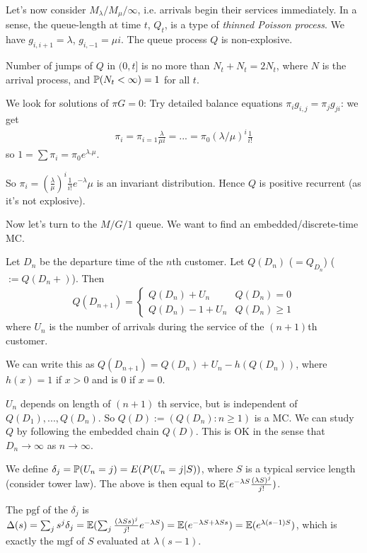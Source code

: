 \documentclass[a4paper]{article}
\begin{document}
Let's now consider $M_\lambda/M_\mu/\infty$, i.e. arrivals begin their services immediately. In a sense, the queue-length at time $t$, $Q_t$, is a type of \emph{thinned Poisson process}. We have $g_{i,i+1} = \lambda$, $g_{i,-1} = \mu i $. The queue process $Q$ is non-explosive.

Number of jumps of $Q$ in $(0,t]$ is no more than $N_t + N_t = 2N_t$, where $N$ is the arrival process, and $\P(N_t < \infty) = 1$ for all $t$.

We look for solutions of $\pi G = 0$: Try detailed balance equations $\pi_i g_{i,j} = \pi_j g_{ji}$: we get
\begin{equation*}
\begin{aligned}
\pi_i = \pi_{i=1} \frac{\lambda}{\mu i} = ... = \pi_0 (\lambda/\mu)^i \frac{1}{i!}
\end{aligned}
\end{equation*}
so $1 = \sum \pi_i = \pi_0 e^{\lambda.\mu}$.

So $\pi_i = (\frac{\lambda}{\mu})^i \frac{1}{i!} e^{-\lambda}{\mu}$ is an invariant distribution. Hence $Q$ is positive recurrent (as it's not explosive).

Now let's turn to the $M/G/1$ queue. We want to find an embedded/discrete-time MC.

Let $D_n$ be the departure time of the $n$th customer. Let $Q(D_n)$ ($=Q_{D_n}$) ($:= Q(D_n+)$). Then 
\begin{equation*}
\begin{aligned}
Q(D_{n+1}) = \left\{\begin{array}{ll}
Q(D_n) + U_n & Q(D_n) =0 \\
Q(D_n) - 1 + U_n & Q(D_n) \geq 1
\end{array}
\right.
\end{aligned}
\end{equation*}
where $U_n$ is the number of arrivals during the service of the $(n+1)$th customer.

We can write this as $Q(D_{n+1}) = Q(D_n) + U_n - h(Q(D_n))$, where $h(x) = 1$ if $x>0$ and is $0$ if $x=0$.

$U_n$ depends on length of $(n+1)$ th service, but is independent of $Q(D_1),...,Q(D_n)$. So $Q(D):=(Q(D_n):n\geq 1)$ is a MC. We can study $Q$ by following the embedded chain $Q(D)$. This is OK in the sense that $D_n \to \infty$ as $n \to \infty$.

We define $\delta_j = \P(U_n = j) = E(P(U_n = j|S))$, where $S$ is a typical service length (consider tower law). The above is then equal to $\E(e^{-\lambda S} \frac{(\lambda S)^j}{j!})$.

The pgf of the $\delta_j$ is $\Delta(s) = \sum_j s^j \delta_j = \E(\sum_j \frac{(\lambda Ss)^j}{j!} e^{-\lambda S}) =\E (e^{-\lambda S + \lambda Ss}) =\E (e^{\lambda(s-1)S})$, which is exactly the mgf of $S$ evaluated at $\lambda(s-1)$.

\end{document}
